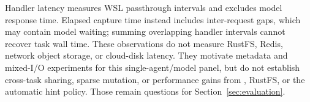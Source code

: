 Handler latency measures WSL passthrough intervals and excludes model response
time. Elapsed capture time instead includes inter-request gaps, which may
contain model waiting; summing overlapping handler intervals cannot recover
task wall time. These observations do not measure RustFS, Redis, network
object storage, or cloud-disk latency. They motivate metadata and mixed-I/O
experiments for this single-agent/model panel, but do not establish cross-task
sharing, sparse mutation, or performance gains from \sysname, RustFS, or
the automatic hint policy. Those remain questions for
Section~\ref{sec:evaluation}.
